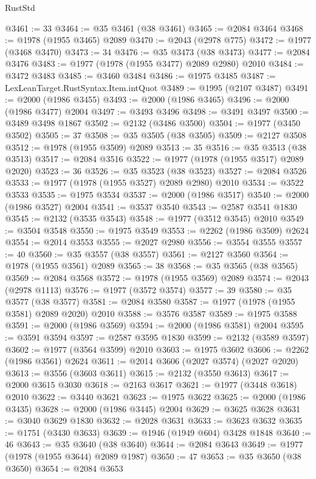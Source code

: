 \begin{lexlean}{RustStd}
\begin{coremodule}
@3461 := 33
@3464 := @35 @3461 (@38 @3461)
@3465 := @2084 @3464
@3468 := @1978 (@1955 @3465) @2089
@3470 := @2043 (@2978 @775)
@3472 := @1977 (@3468 @3470)
@3473 := 34
@3476 := @35 @3473 (@38 @3473)
@3477 := @2084 @3476
@3483 := @1977 (@1978 (@1955 @3477) @2089 @2980) @2010
@3484 := @3472 @3483
@3485 := @3460 @3484
@3486 := @1975 @3485
@3487 := LexLeanTarget.RustSyntax.Item.intQuot
@3489 := @1995 (@2107 @3487)
@3491 := @2000 (@1986 @3455)
@3493 := @2000 (@1986 @3465)
@3496 := @2000 (@1986 @3477) @2004
@3497 := @3493 @3496
@3498 := @3491 @3497
@3500 := @3489 @3498 @1867
@3502 := @2132 (@3486 @3500)
@3504 := @1977 (@3450 @3502)
@3505 := 37
@3508 := @35 @3505 (@38 @3505)
@3509 := @2127 @3508
@3512 := @1978 (@1955 @3509) @2089
@3513 := 35
@3516 := @35 @3513 (@38 @3513)
@3517 := @2084 @3516
@3522 := @1977 (@1978 (@1955 @3517) @2089 @2020)
@3523 := 36
@3526 := @35 @3523 (@38 @3523)
@3527 := @2084 @3526
@3533 := @1977 (@1978 (@1955 @3527) @2089 @2980) @2010
@3534 := @3522 @3533
@3535 := @1975 @3534
@3537 := @2000 (@1986 @3517)
@3540 := @2000 (@1986 @3527) @2004
@3541 := @3537 @3540
@3543 := @2587 @3541 @1830
@3545 := @2132 (@3535 @3543)
@3548 := @1977 (@3512 @3545) @2010
@3549 := @3504 @3548
@3550 := @1975 @3549
@3553 := @2262 (@1986 @3509) @2624
@3554 := @2014 @3553
@3555 := @2027 @2980
@3556 := @3554 @3555
@3557 := 40
@3560 := @35 @3557 (@38 @3557)
@3561 := @2127 @3560
@3564 := @1978 (@1955 @3561) @2089
@3565 := 38
@3568 := @35 @3565 (@38 @3565)
@3569 := @2084 @3568
@3572 := @1978 (@1955 @3569) @2089
@3574 := @2043 (@2978 @1113)
@3576 := @1977 (@3572 @3574)
@3577 := 39
@3580 := @35 @3577 (@38 @3577)
@3581 := @2084 @3580
@3587 := @1977 (@1978 (@1955 @3581) @2089 @2020) @2010
@3588 := @3576 @3587
@3589 := @1975 @3588
@3591 := @2000 (@1986 @3569)
@3594 := @2000 (@1986 @3581) @2004
@3595 := @3591 @3594
@3597 := @2587 @3595 @1830
@3599 := @2132 (@3589 @3597)
@3602 := @1977 (@3564 @3599) @2010
@3603 := @1975 @3602
@3606 := @2262 (@1986 @3561) @2624
@3611 := @2014 @3606 (@2027 @3574) (@2027 @2020)
@3613 := @3556 (@3603 @3611)
@3615 := @2132 (@3550 @3613)
@3617 := @2000 @3615 @3030
@3618 := @2163 @3617
@3621 := @1977 (@3448 @3618) @2010
@3622 := @3440 @3621
@3623 := @1975 @3622
@3625 := @2000 (@1986 @3435)
@3628 := @2000 (@1986 @3445) @2004
@3629 := @3625 @3628
@3631 := @3040 @3629 @1830
@3632 := @2028 @3631
@3633 := @3623 @3632
@3635 := @1751 (@3430 @3633)
@3639 := @1946 (@1949 @604) @3428 @1848
@3640 := 46
@3643 := @35 @3640 (@38 @3640)
@3644 := @2084 @3643
@3649 := @1977 (@1978 (@1955 @3644) @2089 @1987)
@3650 := 47
@3653 := @35 @3650 (@38 @3650)
@3654 := @2084 @3653

\end{coremodule}
\end{lexlean}
